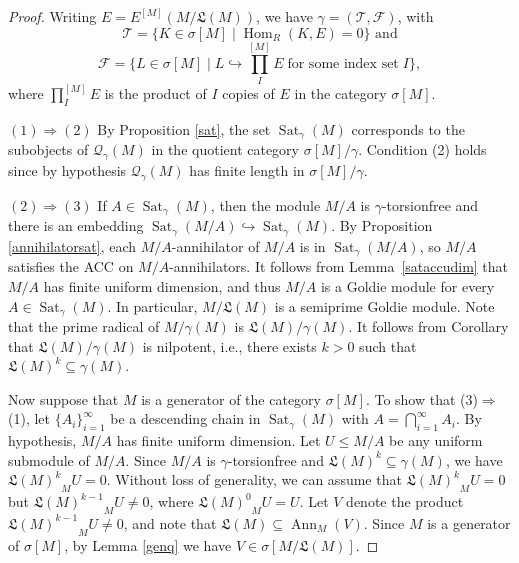 \documentclass{amsart}
\theoremstyle{definition}
\theoremstyle{remark}
\numberwithin{equation}{section}
\DeclareMathOperator{\Ann}{Ann}
\DeclareMathOperator{\Hom}{Hom}
\DeclareMathOperator{\Sat}{Sat}
\newcommand{\sm}{\sigma[M]}
\begin{document}
	\begin{proof}
		Writing $E=E^{[M]}(M/\mathfrak{L}(M))$, 
		we have $\gamma=(\mathcal{T},\mathcal{F})$, with 
		\[\mathcal{T}=\{K\in\sm\mid \Hom_R(K,E)=0\}\text{ and}\]
		\[\mathcal{F}=\{L\in\sm\mid L\hookrightarrow \textstyle{\prod_I^{[M]}E}\;
		\text{for some index set}\;I\},\]
		where $\prod_I^{[M]}E$ is the product of $I$ copies of $E$ 
		in the category $\sm$. 
		
		$(1)\Rightarrow(2)$ 
		By Proposition \ref{sat},
		the set $\Sat_\gamma(M)$ corresponds to 
		the subobjects of $\mathcal{Q}_\gamma(M)$ 
		in the quotient category $\sm/\gamma$. 
		Condition (2) holds since by hypothesis
		$\mathcal{Q}_\gamma(M)$ has finite length in $\sm/\gamma$.  
		
		$(2)\Rightarrow(3)$ 
		If $A\in\Sat_\gamma(M)$, 
		then the module $M/A$ is $\gamma$-torsionfree 
		and there is an embedding  $\Sat_\gamma(M/A)\hookrightarrow\Sat_\gamma(M)$. 
		By Proposition \ref{annihilatorsat}, 
		each $M/A$-annihilator of $M/A$ is in $\Sat_\gamma(M/A)$, 
		so $M/A$ satisfies the ACC on $M/A$-annihilators. 
		It follows from Lemma~\ref{sataccudim} 
		that $M/A$ has finite uniform dimension, 
		and thus $M/A$ is a Goldie module for every $A\in\Sat_\gamma(M)$. 
		In particular, $M/\mathfrak{L}(M)$ is a semiprime Goldie module. 
		Note that the prime radical of $M/\gamma(M)$ is $\mathfrak{L}(M)/\gamma(M)$. 
		It follows from Corollary \cite[Corollary 5.4]{mauprimerad} 
		that $\mathfrak{L}(M)/\gamma(M)$ is nilpotent, i.e., 
		there exists $k>0$ such that $\mathfrak{L}(M)^{k}\subseteq\gamma(M)$.
		
		Now suppose that $M$ is a generator of the category $\sm$. 
		To show that (3)$\Rightarrow$(1), 
		let $\{A_i\}_{i=1}^\infty$ be a descending chain in $\Sat_\gamma(M)$ 
		with $A=\bigcap_{i=1}^\infty A_i$. 
		By hypothesis, $M/A$ has finite uniform dimension. 
		Let $U\leq M/A$ be any uniform submodule of $M/A$. 
		Since $M/A$ is $\gamma$-torsionfree and $\mathfrak{L}(M)^k\subseteq\gamma(M)$, 
		we have ${\mathfrak{L}(M)^k}_MU=0$. 
		Without loss of generality, 
		we can assume that ${\mathfrak{L}(M)^k}_MU=0$ 
		but ${\mathfrak{L}(M)^{k-1}}_MU\neq 0$, 
		where ${\mathfrak{L}(M)^0}_MU=U$. 
		Let $V$ denote the product ${\mathfrak{L}(M)^{k-1}}_MU\neq 0$, 
		and note that $\mathfrak{L}(M)\subseteq \Ann_M(V)$. 
		Since $M$ is a generator of $\sm$, 
		by Lemma \ref{genq} we have $V\in\sigma[M/\mathfrak{L}(M)]$.
		

\end{proof}
\end{document}
